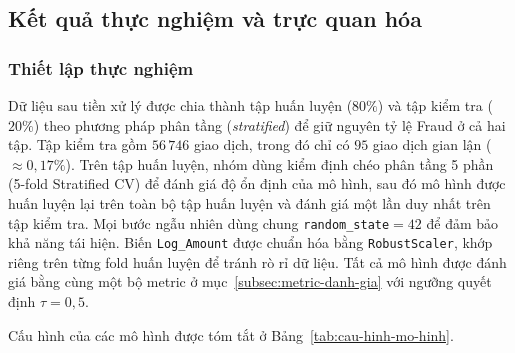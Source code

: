 
\subsection{Kết quả thực nghiệm và trực quan hóa}\label{subsec:ket-qua-truc-quan}

\subsubsection{Thiết lập thực nghiệm}
Dữ liệu sau tiền xử lý được chia thành tập huấn luyện ($80\%$) và tập kiểm tra ($20\%$) theo phương pháp phân tầng (\textit{stratified}) để giữ nguyên tỷ lệ Fraud ở cả hai tập. Tập kiểm tra gồm $56\,746$ giao dịch, trong đó chỉ có $95$ giao dịch gian lận ($\approx 0{,}17\%$). Trên tập huấn luyện, nhóm dùng kiểm định chéo phân tầng 5 phần (5-fold Stratified CV) để đánh giá độ ổn định của mô hình, sau đó mô hình được huấn luyện lại trên toàn bộ tập huấn luyện và đánh giá một lần duy nhất trên tập kiểm tra. Mọi bước ngẫu nhiên dùng chung \texttt{random\_state}$=42$ để đảm bảo khả năng tái hiện. Biến \texttt{Log\_Amount} được chuẩn hóa bằng \texttt{RobustScaler}, khớp riêng trên từng fold huấn luyện để tránh rò rỉ dữ liệu. Tất cả mô hình được đánh giá bằng cùng một bộ metric ở mục~\ref{subsec:metric-danh-gia} với ngưỡng quyết định $\tau = 0{,}5$.

Cấu hình của các mô hình được tóm tắt ở Bảng~\ref{tab:cau-hinh-mo-hinh}.

\begin{table}[H]
\centering
{}
\caption{Cấu hình các mô hình trong thực nghiệm.}
\label{tab:cau-hinh-mo-hinh}
\end{table}

